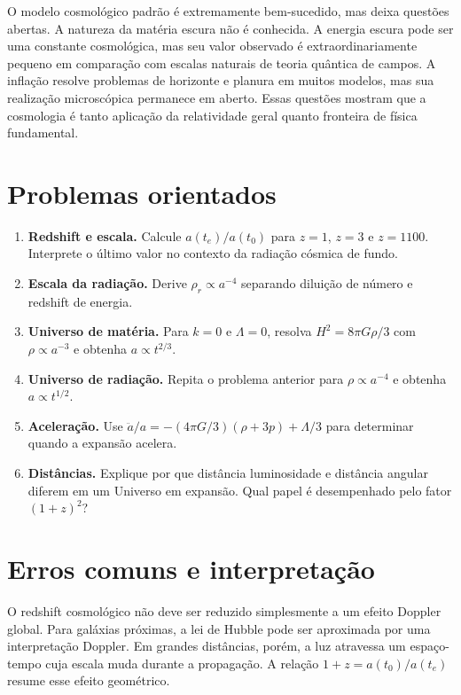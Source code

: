 \documentclass[12pt,a4paper,oneside]{book}
\theoremstyle{rgplain}
\theoremstyle{rgremark}
\begin{document}
O modelo cosmológico padrão é extremamente bem-sucedido, mas deixa questões
abertas. A natureza da matéria escura não é conhecida. A energia escura pode
ser uma constante cosmológica, mas seu valor observado é extraordinariamente
pequeno em comparação com escalas naturais de teoria quântica de campos. A
inflação resolve problemas de horizonte e planura em muitos modelos, mas sua
realização microscópica permanece em aberto. Essas questões mostram que a
cosmologia é tanto aplicação da relatividade geral quanto fronteira de física
fundamental.

\section{Problemas orientados}

\begin{enumerate}
  \item \textbf{Redshift e escala.} Calcule $a(t_e)/a(t_0)$ para $z=1$, $z=3$ e
  $z=1100$. Interprete o último valor no contexto da radiação cósmica de fundo.

  \item \textbf{Escala da radiação.} Derive $\rho_r\propto a^{-4}$ separando
  diluição de número e redshift de energia.

  \item \textbf{Universo de matéria.} Para $k=0$ e $\Lambda=0$, resolva
  $H^2=8\pi G\rho/3$ com $\rho\propto a^{-3}$ e obtenha $a\propto t^{2/3}$.

  \item \textbf{Universo de radiação.} Repita o problema anterior para
  $\rho\propto a^{-4}$ e obtenha $a\propto t^{1/2}$.

  \item \textbf{Aceleração.} Use
  $\ddot a/a=-(4\pi G/3)(\rho+3p)+\Lambda/3$ para determinar quando a expansão
  acelera.

  \item \textbf{Distâncias.} Explique por que distância luminosidade e
  distância angular diferem em um Universo em expansão. Qual papel é
  desempenhado pelo fator $(1+z)^2$?
\end{enumerate}

\section{Erros comuns e interpretação}

O redshift cosmológico não deve ser reduzido simplesmente a um efeito Doppler
global. Para galáxias próximas, a lei de Hubble pode ser aproximada por uma
interpretação Doppler. Em grandes distâncias, porém, a luz atravessa um
espaço-tempo cuja escala muda durante a propagação. A relação
$1+z=a(t_0)/a(t_e)$ resume esse efeito geométrico.
\end{document}
